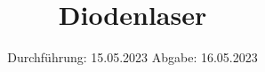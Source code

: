 

\subject{VERSUCH 60}
\title{Diodenlaser}
\date{%
  Durchführung: 15.05.2023
  \hspace{3em}
  Abgabe: 16.05.2023
}



\maketitle
\thispagestyle{empty}
\tableofcontents
\newpage






\printbibliography{}


